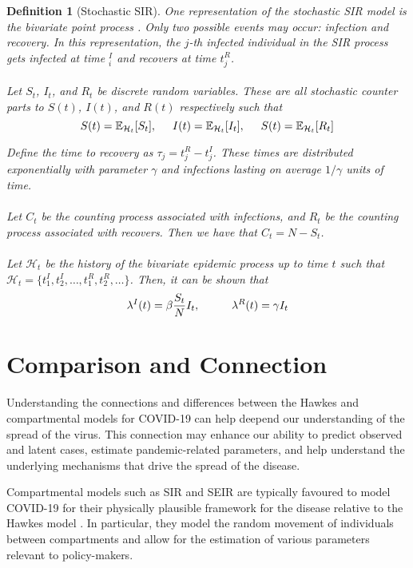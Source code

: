 \documentclass[12pt]{article}
\newtheorem{definition}{Definition}
\begin{document}
\begin{definition}[Stochastic SIR]
One representation of the stochastic SIR model is the bivariate point process \cite{Rizoiu2018}. Only two possible events may occur: infection and recovery. In this representation, the $j$-th infected individual in the SIR process gets infected at time $_i^I$ and recovers at time $t_j^R$. 
\\
\\
Let $S_t$, $I_t$, and $R_t$ be discrete random variables. These are all stochastic counter parts to $S(t)$, $I(t)$, and $R(t)$ respectively such that
$$
S(t) = \mathbb{E}_{\mathcal{H}_t} [ S_t ] , \hspace{5mm}
I(t) = \mathbb{E}_{\mathcal{H}_t} [ I_t ] , \hspace{5mm}
S(t) = \mathbb{E}_{\mathcal{H}_t} [ R_t ] 
$$


Define the time to recovery as $\tau_j = t_j^R - t_j^I$. These times are distributed exponentially with parameter $\gamma$ and infections lasting on average $1/\gamma$ units of time. 
\\
\\
Let $C_t$ be the counting process associated with infections, and $R_t$ be the counting process associated with recovers. Then we have that $C_t = N - S_t$. 
\\
\\
Let $\mathcal{H}_t$ be the history of the bivariate epidemic process up to time $t$ such that $\mathcal{H}_t = \{t_1^I, t_2^I, \ldots, t_1^R, t_2^R, \ldots \}$. Then, it can be shown that
$$
\lambda^I(t) = \beta \frac{S_t}{N} I_t, \hspace{10mm}
\lambda^R(t) = \gamma I_t
$$  
\end{definition}


\section{Comparison and Connection}

Understanding the connections and differences between the Hawkes and compartmental models for COVID-19 can help deepend our understanding of the spread of the virus. This connection may enhance our ability to predict observed and latent cases, estimate pandemic-related parameters, and help understand the underlying mechanisms that drive the spread of the disease. 

Compartmental models such as SIR and SEIR are typically favoured to model COVID-19 for their physically plausible framework for the disease relative to the Hawkes model \cite{Kresin2022}. In particular, they model the random movement of individuals between compartments and allow for the estimation of various parameters relevant to policy-makers. 
\end{document}
